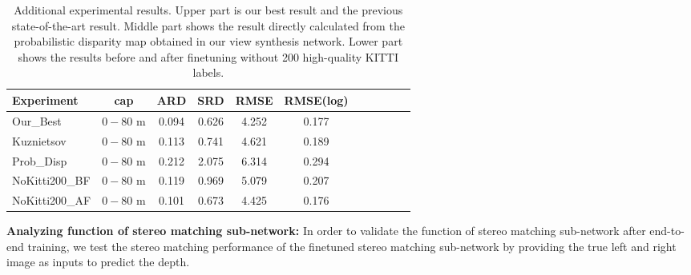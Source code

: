\documentclass[10pt,twocolumn,letterpaper]{article}
\begin{document}
\vspace{-4pt}
\begin{table}[!htp]
	\centering
	\footnotesize
	\begin{adjustbox}{max width=1.0\textwidth}
	\renewcommand{\arraystretch}{0}
	\begin{tabular}{@{}l|c|c|c|c|ccc|ccc@{}}
	\toprule
\multicolumn{1}{l|}{Experiment} & \multicolumn{1}{c|}{cap} & ARD   & SRD   & RMSE   & RMSE(log) \\ \midrule
Our\_Best  & $0-80$ m &0.094 & 0.626 & 4.252 & 0.177 \\ 
Kuznietsov \cite{kuznietsov2017semi}  & $0-80$ m &0.113 & 0.741 & 4.621 & 0.189 \\ \midrule
Prob\_Disp  & $0-80$ m & 0.212 & 2.075 & 6.314 & 0.294 \\ \midrule
NoKitti200\_BF  & $0-80$ m &0.119 & 0.969 & 5.079 & 0.207 \\ 
NoKitti200\_AF & $0-80$ m &0.101 & 0.673 & 4.425 & 0.176 \\
	\bottomrule
	\end{tabular}
	\end{adjustbox}
	\vspace{-4pt}
	\caption{Additional experimental results. Upper part is our best result and the previous state-of-the-art result. Middle part shows the result directly calculated from the probabilistic disparity map obtained in our view synthesis network. Lower part shows the results before and after finetuning without 200 high-quality KITTI labels.}
	\label{table:addResults}
\vspace{-6pt}
\end{table}

\textbf{Analyzing function of stereo matching sub-network:}
In order to validate the function of stereo matching sub-network after end-to-end training, we test the stereo matching performance of the finetuned stereo matching sub-network by providing the true left and right image as inputs to predict the depth. 
\end{document}
